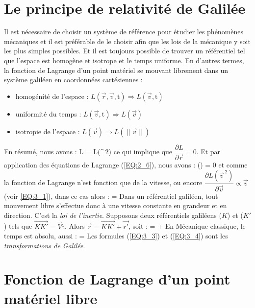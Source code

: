 \section{Le principe de relativit\'e de Galil\'ee}

Il est n\'ecessaire de choisir un syst\`eme de r\'ef\'erence pour \'etudier les ph\'enom\`enes m\'ecaniques et il est pr\'ef\'erable de le choisir afin que les lois de la m\'ecanique y soit les plus simples possibles. Et il est toujours possible de trouver un r\'ef\'erentiel tel que l'espace est homog\`ene et isotrope et le temps uniforme. En d'autres termes, la fonction de Lagrange d'un point mat\'eriel se mouvant librement dans un syst\`eme galil\'een en coordonn\'ees cart\'esiennes :
\begin{itemize}
	\item homog\'en\'it\'e de l'espace : $L(\vec{r},\vec{v},\mathrm{t}) \Rightarrow L(\vec{v},\mathrm{t})$
	\item uniformit\'e du temps : $L(\vec{v},\mathrm{t}) \Rightarrow L(\vec{v})$
	\item isotropie de l'espace : $L(\vec{v}) \Rightarrow L(\lVert\vec{v}\rVert)$
\end{itemize}
En r\'esum\'e, nous avons :
\be
	L = L(^{\,2}) \label{EQ:3_1}
\ee
ce qui implique que $\dfrac{\partial L}{\partial \vec{r}} = 0$. Et par application des \'equations de Lagrange (\ref{EQ:2_6}), nous avons :
\benn
	\left(\right) = 0
\eenn
et comme la fonction de Lagrange n'est fonction que de la vitesse, ou encore $\dfrac{\partial L({\vec{v}}^{\,2})}{\partial \vec{v}} \propto \vec{v}$ (voir \ref{EQ:3_1}), dans ce cas alors :
\be
	 =  \label{EQ:3_2}
\ee
Dans un r\'ef\'erentiel galil\'een, tout mouvement libre s'effectue donc \`a une vitesse constante en grandeur et en direction. C'est la \emph{loi de l'inertie}. Supposons deux r\'ef\'erentiels galil\'eens ($K$) et ($K'$) tels que $\vec{KK'}=\vec{V}\mathrm{t}$. Alors $\vec{r}=\vec{KK'}+\vec{r'}$, soit :
\be
	 =  +  \label{EQ:3_3}
\ee
En M\'ecanique classique, le temps est absolu, aussi :
\be
	 =  \label{EQ:3_4}
\ee
Les formules (\ref{EQ:3_3}) et (\ref{EQ:3_4}) sont les \emph{transformations de Galil\'ee}.

\section{Fonction de Lagrange d'un point mat\'eriel libre}

